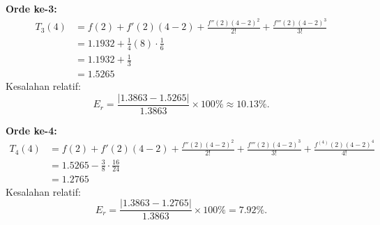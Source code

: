\documentclass{article}
\begin{document}
\begin{enumerate}
    \textbf{Orde ke-3:} 
    \begin{align*}
        T_3(4) 
        &= f(2) + f'(2)(4-2) + \frac{f''(2)(4-2)^2}{2!} + \frac{f'''(2)(4-2)^3}{3!} \\
        &= \num{1,1932} + \frac{1}{4}(8) \cdot \frac{1}{6} \\
        &= \num{1,1932} + \frac{1}{3} \\
        &= \num{1,5265}
    \end{align*}
    Kesalahan relatif:
    \begin{equation*}
        E_r = \frac{\left|\num{1,3863} - \num{1,5265}\right|}{\num{1,3863}} \times 100\% \approx \num{10,13}\%.
    \end{equation*}
    
    \textbf{Orde ke-4:} 
    \begin{align*}
        T_4(4) 
        &= f(2) + f'(2)(4-2) + \frac{f''(2)(4-2)^2}{2!} + \frac{f'''(2)(4-2)^3}{3!} + \frac{f^{(4)}(2)(4-2)^4}{4!} \\
        &= \num{1,5265} - \frac{3}{8} \cdot \frac{16}{24} \\
        &= \num{1,2765}
    \end{align*}
    Kesalahan relatif:
    \begin{equation*}
        E_r = \frac{\left|\num{1,3863} - \num{1,2765}\right|}{\num{1,3863}} \times 100\% = \num{7,92}\%.
    \end{equation*}    
\end{enumerate}
\end{document}
